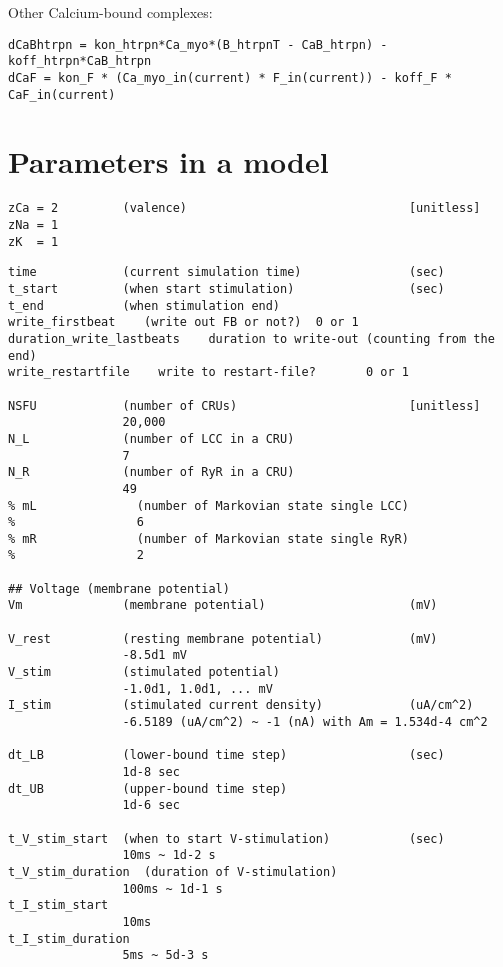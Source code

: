 Other Calcium-bound complexes:
\begin{verbatim}
dCaBhtrpn = kon_htrpn*Ca_myo*(B_htrpnT - CaB_htrpn) - koff_htrpn*CaB_htrpn  
dCaF = kon_F * (Ca_myo_in(current) * F_in(current)) - koff_F * CaF_in(current) 
\end{verbatim}

\section{Parameters in a model}
\label{sec:parameters-model}

\begin{verbatim}
zCa = 2         (valence)                               [unitless]
zNa = 1
zK  = 1   
\end{verbatim}

\begin{verbatim}
time            (current simulation time)               (sec)
t_start         (when start stimulation)                (sec)
t_end           (when stimulation end)
write_firstbeat    (write out FB or not?)  0 or 1
duration_write_lastbeats    duration to write-out (counting from the end)
write_restartfile    write to restart-file?       0 or 1

NSFU            (number of CRUs)                        [unitless]
                20,000
N_L             (number of LCC in a CRU)
                7
N_R             (number of RyR in a CRU)
                49 
% mL              (number of Markovian state single LCC)
%                 6
% mR              (number of Markovian state single RyR)
%                 2

## Voltage (membrane potential)
Vm              (membrane potential)                    (mV)

V_rest          (resting membrane potential)            (mV)
                -8.5d1 mV
V_stim          (stimulated potential)
                -1.0d1, 1.0d1, ... mV
I_stim          (stimulated current density)            (uA/cm^2)
                -6.5189 (uA/cm^2) ~ -1 (nA) with Am = 1.534d-4 cm^2

dt_LB           (lower-bound time step)                 (sec)
                1d-8 sec
dt_UB           (upper-bound time step)
                1d-6 sec

t_V_stim_start  (when to start V-stimulation)           (sec)
                10ms ~ 1d-2 s
t_V_stim_duration  (duration of V-stimulation) 
                100ms ~ 1d-1 s
t_I_stim_start
                10ms 
t_I_stim_duration
                5ms ~ 5d-3 s


\end{verbatim}
